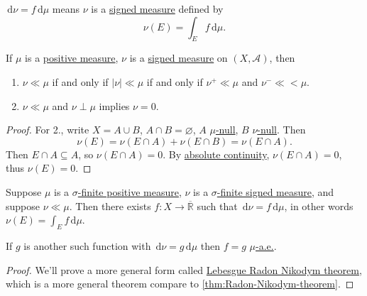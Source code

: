 \begin{notation}
	\(\,\mathrm{d} \nu = f \,\mathrm{d} \mu\) means \(\nu\) is a \hyperref[def:signed-measure]{signed measure} defined by
	\[
		\nu(E) = \int_E f \,\mathrm{d} \mu.
	\]
\end{notation}

\begin{lemma}
	If \(\mu\) is a \hyperref[def:signed-measure]{positive measure}, \(\nu\) is a \hyperref[def:signed-measure]{signed measure} on \((X, \mathcal{A})\), then
	\begin{enumerate}
		\item \(\nu \ll \mu\) if and only if \(\left\vert \nu \right\vert \ll \mu\) if and only if \(\nu^+ \ll \mu\) and \(\nu^- \ll< \mu\).
		\item \(\nu \ll \mu\) and \(\nu \perp \mu\) implies \(\nu = 0\).
	\end{enumerate}
\end{lemma}

\begin{proof}

	For 2., write \(X = A \cup B\), \(A \cap B = \varnothing\), \(A\) \hyperref[def:null-set-for-a-signed-measure]{\(\mu\)-null}, \(B\) \hyperref[def:null-set-for-a-signed-measure]{\(\nu\)-null}.
	Then
	\[
		\nu(E) = \nu(E \cap A) + \nu(E \cap B) = \nu(E \cap A).
	\]
	Then \(E \cap A \subseteq A\), so \(\nu(E \cap A) = 0\). By \hyperref[def:absolutely-continuous]{absolute continuity}, \(\nu(E \cap A) = 0\), thus \(\nu(E) = 0\).
\end{proof}

\begin{theorem}\label{thm:Radon-Nikodym-theorem}
	Suppose \(\mu\) is a \hyperref[def:finite-signed-measure]{\(\sigma\)-finite positive measure}, \(\nu\) is a \hyperref[def:finite-signed-measure]{\(\sigma\)-finite signed measure},
	and suppose \(\nu \ll \mu\). Then there exists \(f \colon X \to \overline{\mathbb{R}}\) such that \(\,\mathrm{d} \nu = f \,\mathrm{d} \mu\), in other words \(\nu(E) = \int_E f \,\mathrm{d} \mu\).

	If \(g\) is another such function with \(\,\mathrm{d} \nu = g \,\mathrm{d} \mu\) then \(f = g\) \hyperref[def:mu-almost-everywhere]{\(\mu\)-a.e.}.
\end{theorem}
\begin{proof}
	We'll prove a more general form called \hyperref[thm:Lebesgue-Radon-Nikodym-theorem]{Lebesgue Radon Nikodym theorem}, which is a more general
	theorem compare to \autoref{thm:Radon-Nikodym-theorem}.
\end{proof}

